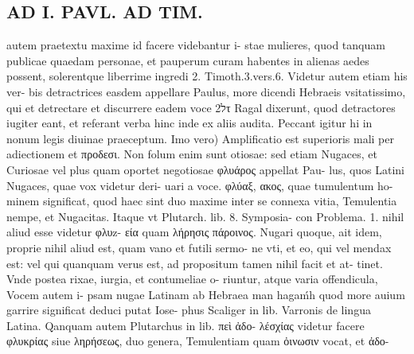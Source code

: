 \documentclass{article}
\begin{document}
\begin{pages}
\section*{AD I. PAVL. AD TIM. }
\marginpar{[ p.286 ]}\pstart autem praetextu maxime id facere videbantur i- stae mulieres, quod tanquam publicae quaedam personae, et pauperum curam habentes in alienas aedes possent, solerentque liberrime ingredi 2. Timoth.3.vers.6. Videtur autem etiam his ver- bis detractrices easdem appellare Paulus, more dicendi Hebraeis vsitatissimo, qui et detrectare et discurrere eadem voce 2לτ Ragal dixerunt, quod detractores iugiter eant, et referant verba hinc inde ex aliis audita. Peccant igitur hi in nonum legis diuinae praeceptum. Imo vero) Amplificatio est superioris mali per adiectionem et προδεσι. Non folum enim sunt otiosae: sed etiam Nugaces, et Curiosae vel plus quam oportet negotiosae φλυάρος appellat Pau- lus, quos Latini Nugaces, quae vox videtur deri- uari a voce. φλύαξ, ακος, quae tumulentum ho- minem significat, quod haec sint duo maxime inter se connexa vitia, Temulentia nempe, et Nugacitas. Itaque vt Plutarch. lib. 8. Symposia- con Problema. 1. nihil aliud esse videtur φλυz- εία quam λήρησις πάροινος. Nugari quoque, ait idem, proprie nihil aliud est, quam vano et futili sermo- ne vti, et eo, qui vel mendax est: vel qui quanquam verus est, ad propositum tamen nihil facit et at- tinet. Vnde postea rixae, iurgia, et contumeliae o- riuntur, atque varia offendicula, Vocem autem i- psam nugae Latinam ab Hebraea man hagaḿh quod more auium garrire significat deduci putat Iose- phus Scaliger in lib.  Varronis de lingua Latina. Qanquam autem Plutarchus in lib.  πεὶ ἀδο- λέσχίας videtur facere φλυκρίας siue ληρήσεως, duo genera, Temulentiam quam ὀινωσιν vocat, et ἀδο-  \pend

\end{pages}
\end{document}
